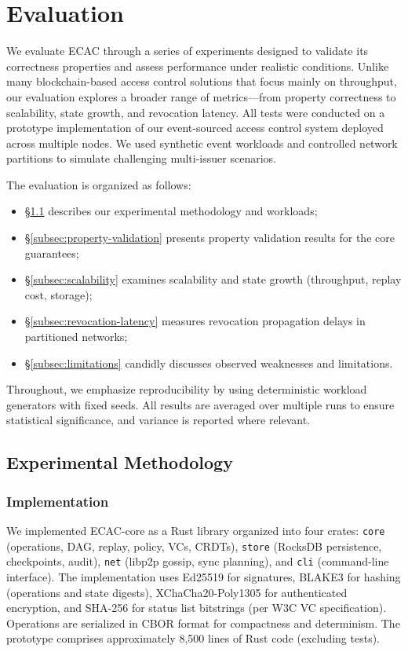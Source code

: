 \section{Evaluation}
We evaluate ECAC through a series of experiments designed to validate its correctness properties and
assess performance under realistic conditions. Unlike many blockchain-based access control solutions that
focus mainly on throughput, our evaluation explores a broader range of metrics---from property
correctness to scalability, state growth, and revocation latency. All tests were conducted on a prototype
implementation of our event-sourced access control system deployed across multiple nodes. We used
synthetic event workloads and controlled network partitions to simulate challenging multi-issuer scenarios.

The evaluation is organized as follows:
\begin{itemize}
    \item \S\ref{subsec:methodology} describes our experimental methodology and workloads;
    \item \S\ref{subsec:property-validation} presents property validation results for the core guarantees;
    \item \S\ref{subsec:scalability} examines scalability and state growth (throughput, replay cost, storage);
    \item \S\ref{subsec:revocation-latency} measures revocation propagation delays in partitioned networks;
    \item \S\ref{subsec:limitations} candidly discusses observed weaknesses and limitations.
\end{itemize}

Throughout, we emphasize reproducibility by using deterministic workload generators with fixed seeds. All results are averaged over multiple runs to ensure statistical significance, and variance is reported where relevant.

\subsection{Experimental Methodology}\label{subsec:methodology}

\subsubsection{Implementation}
We implemented ECAC-core as a Rust library organized into four crates: \texttt{core} (operations, DAG, replay, policy, VCs, CRDTs), \texttt{store} (RocksDB persistence, checkpoints, audit), \texttt{net} (libp2p gossip, sync planning), and \texttt{cli} (command-line interface). The implementation uses Ed25519 for signatures, BLAKE3 for hashing (operations and state digests), XChaCha20-Poly1305 for authenticated encryption, and SHA-256 for status list bitstrings (per W3C VC specification). Operations are serialized in CBOR format for compactness and determinism. The prototype comprises approximately 8,500 lines of Rust code (excluding tests).

